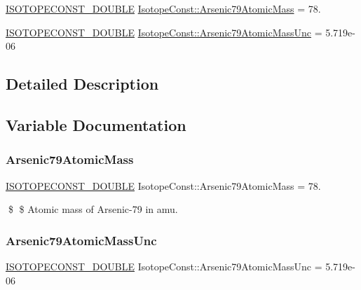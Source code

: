 \begin{DoxyCompactItemize}
\item 
\mbox{\hyperlink{group___isotope_const-_macros_ga8f45a7272ce02c0b4c65c44636ed719a}{I\+S\+O\+T\+O\+P\+E\+C\+O\+N\+S\+T\+\_\+\+D\+O\+U\+B\+LE}} \mbox{\hyperlink{group___isotope_const-_arsenic-_as79_ga1041b9ba9ff1d1304efdcd4ce23191f8}{Isotope\+Const\+::\+Arsenic79\+Atomic\+Mass}} = 78.
\item 
\mbox{\hyperlink{group___isotope_const-_macros_ga8f45a7272ce02c0b4c65c44636ed719a}{I\+S\+O\+T\+O\+P\+E\+C\+O\+N\+S\+T\+\_\+\+D\+O\+U\+B\+LE}} \mbox{\hyperlink{group___isotope_const-_arsenic-_as79_ga3466800312ea2d1dbbe6cc96b8b117e7}{Isotope\+Const\+::\+Arsenic79\+Atomic\+Mass\+Unc}} = 5.\+719e-\/06
\end{DoxyCompactItemize}


\subsection{Detailed Description}


\subsection{Variable Documentation}
\mbox{\label{group___isotope_const-_arsenic-_as79_ga1041b9ba9ff1d1304efdcd4ce23191f8}} 
\subsubsection{\texorpdfstring{Arsenic79\+Atomic\+Mass}{Arsenic79AtomicMass}}
{\footnotesize\ttfamily \mbox{\hyperlink{group___isotope_const-_macros_ga8f45a7272ce02c0b4c65c44636ed719a}{I\+S\+O\+T\+O\+P\+E\+C\+O\+N\+S\+T\+\_\+\+D\+O\+U\+B\+LE}} Isotope\+Const\+::\+Arsenic79\+Atomic\+Mass = 78.}

\$ \$ Atomic mass of Arsenic-\/79 in amu. \mbox{\label{group___isotope_const-_arsenic-_as79_ga3466800312ea2d1dbbe6cc96b8b117e7}} 
\subsubsection{\texorpdfstring{Arsenic79\+Atomic\+Mass\+Unc}{Arsenic79AtomicMassUnc}}
{\footnotesize\ttfamily \mbox{\hyperlink{group___isotope_const-_macros_ga8f45a7272ce02c0b4c65c44636ed719a}{I\+S\+O\+T\+O\+P\+E\+C\+O\+N\+S\+T\+\_\+\+D\+O\+U\+B\+LE}} Isotope\+Const\+::\+Arsenic79\+Atomic\+Mass\+Unc = 5.\+719e-\/06}

